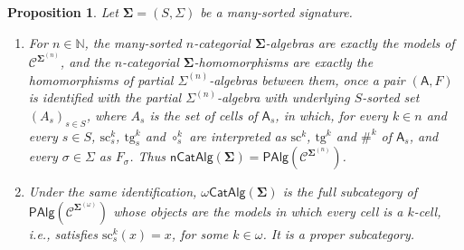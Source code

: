 \documentclass{amsart}
\theoremstyle{plain}
\newtheorem{proposition}[theorem]{Proposition}
\theoremstyle{definition}
\begin{document}
\begin{proposition}\label{PCompactIdent}
Let $\mathbf{\Sigma}=(S,\Sigma)$ be a many-sorted signature.
\begin{enumerate}
\item For $n\in\mathbb{N}$, the many-sorted $n$-categorial $\mathbf{\Sigma}$-algebras are exactly the models of $\boldsymbol{\mathcal{C}}^{\mathbf{\Sigma}^{(n)}}$, and the $n$-categorial $\mathbf{\Sigma}$-homomorphisms are exactly the homomorphisms of partial $\Sigma^{(n)}$-algebras between them, once a pair $(\mathsf{A},F)$ is identified with the partial $\Sigma^{(n)}$-algebra with underlying $S$-sorted set $(A_{s})_{s\in S}$, where $A_{s}$ is the set of cells of $\mathsf{A}_{s}$, in which, for every $k\in n$ and every $s\in S$, $\mathrm{sc}^{k}_{s}$, $\mathrm{tg}^{k}_{s}$ and $\circ^{k}_{s}$ are interpreted as $\mathrm{sc}^{k}$, $\mathrm{tg}^{k}$ and $\#^{k}$ of $\mathsf{A}_{s}$, and every $\sigma\in\Sigma$ as $F_{\sigma}$. Thus $\mathsf{nCatAlg}(\mathbf{\Sigma})=\mathsf{PAlg}(\boldsymbol{\mathcal{C}}^{\mathbf{\Sigma}^{(n)}})$.
\item Under the same identification, $\omega\mathsf{CatAlg}(\mathbf{\Sigma})$ is the full subcategory of $\mathsf{PAlg}(\boldsymbol{\mathcal{C}}^{\mathbf{\Sigma}^{(\omega)}})$ whose objects are the models in which every cell is a $k$-cell, i.e., satisfies $\mathrm{sc}^{k}_{s}(x)=x$, for some $k\in\omega$. It is a proper subcategory.
\end{enumerate}
\end{proposition}
\end{document}
